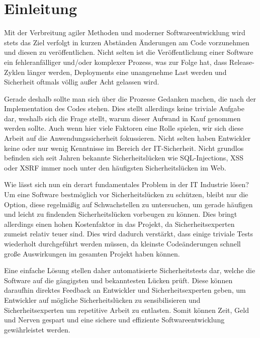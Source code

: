 
\section{Einleitung}\label{sec:introduction}
Mit der Verbreitung agiler Methoden und moderner Softwareentwicklung wird stets das Ziel verfolgt in kurzen Abständen Änderungen am Code vorzunehmen und diesen zu veröffentlichen.
Nicht selten ist die Veröffentlichung einer Software ein fehleranfälliger und/oder komplexer Prozess, was zur Folge hat, dass Release-Zyklen länger werden, Deployments eine unangenehme Last werden und Sicherheit oftmals völlig außer Acht gelassen wird.

Gerade deshalb sollte man sich über die Prozesse Gedanken machen, die nach der Implementation des Codes stehen.
Dies stellt allerdings keine triviale Aufgabe dar, weshalb sich die Frage stellt, warum dieser Aufwand in Kauf genommen werden sollte.
Auch wenn hier viele Faktoren eine Rolle spielen, wir sich diese Arbeit auf die Anwendungssicherheit fokussieren.
Nicht selten haben Entwickler keine oder nur wenig Kenntnisse im Bereich der IT-Sicherheit.
Nicht grundlos befinden sich seit Jahren bekannte Sicherheitslücken wie SQL-Injections, XSS oder XSRF immer noch unter den häufigsten Sicherheitslücken im Web.\cite{invictiInvictiAppSecIndicator2021}

Wie lässt sich nun ein derart fundamentales Problem in der IT Industrie lösen?
Um eine Software bestmöglich vor Sicherheitslücken zu schützen, bleibt nur die Option, diese regelmäßig auf Schwachstellen zu untersuchen, um gerade häufigen und leicht zu findenden Sicherheitslücken vorbeugen zu können.
Dies bringt allerdings einen hohen Kostenfaktor in das Projekt, da Sicherheitsexperten zumeist relativ teuer sind.
Dies wird dadurch verstärkt, dass einige triviale Tests wiederholt durchgeführt werden müssen, da kleinste Codeänderungen schnell große Auswirkungen im gesamten Projekt haben können.

Eine einfache Lösung stellen daher automatisierte Sicherheitstests dar, welche die Software auf die gängigsten und bekanntesten Lücken prüft.
Diese können daraufhin direktes Feedback an Entwickler und Sicherheitsexperten geben, um Entwickler auf mögliche Sicherheitslücken zu sensibilisieren und Sicherheitsexperten um repetitive Arbeit zu entlasten.
Somit können Zeit, Geld und Nerven gespart und eine sichere und effiziente Softwareentwicklung gewährleistet werden.